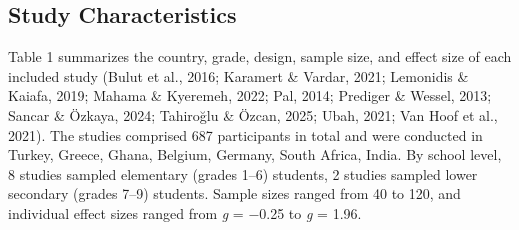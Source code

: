 \documentclass[man,a4paper,12pt,floatsintext,nolmodern,notab]{apa7}
\begin{document}
\subsection{Study Characteristics}
Table 1 summarizes the country, grade, design, sample size, and effect size of each included study (Bulut et al., 2016; Karamert \& Vardar, 2021; Lemonidis \& Kaiafa, 2019; Mahama \& Kyeremeh, 2022; Pal, 2014; Prediger \& Wessel, 2013; Sancar \& Özkaya, 2024; Tahiroğlu \& Özcan, 2025; Ubah, 2021; Van Hoof et al., 2021). The studies comprised 687 participants in total and were conducted in Turkey, Greece, Ghana, Belgium, Germany, South Africa, India. By school level, 8 studies sampled elementary (grades 1–6) students, 2 studies sampled lower secondary (grades 7–9) students. Sample sizes ranged from 40 to 120, and individual effect sizes ranged from \textit{g} = \ensuremath{-}0.25 to \textit{g} = 1.96.
\end{document}

